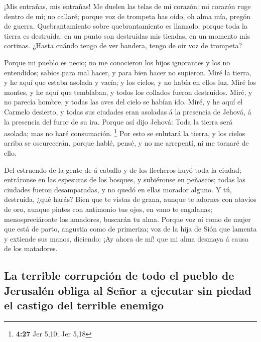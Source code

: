  ¡Mis entrañas, mis entrañas! Me duelen las telas de mi
corazón: mi corazón ruge dentro de mí; no callaré; porque voz de
trompeta has oído, oh alma mía, pregón de guerra. 
Quebrantamiento sobre quebrantamiento es llamado; porque toda la tierra
es destruída: en un punto son destruídas mis tiendas, en un momento mis
cortinas.  ¿Hasta cuándo tengo de ver bandera, tengo de oir
voz de trompeta?

 Porque mi pueblo es necio; no me conocieron los hijos
ignorantes y los no entendidos; sabios para mal hacer, y para bien hacer
no supieron.  Miré la tierra, y he aquí que estaba asolada
y vacía; y los cielos, y no había en ellos luz.  Miré los
montes, y he aquí que temblaban, y todos los collados fueron destruídos.
 Miré, y no parecía hombre, y todas las aves del cielo se
habían ido.  Miré, y he aquí el Carmelo desierto, y todas
sus ciudades eran asoladas á la presencia de Jehová, á la presencia del
furor de su ira.  Porque así dijo Jehová: Toda la tierra
será asolada; mas no haré consumación. \footnote{\textbf{4:27} Jer 5,10;
  Jer 5,18}  Por esto se enlutará la tierra, y los cielos
arriba se oscurecerán, porque hablé, pensé, y no me arrepentí, ni me
tornaré de ello.

 Del estruendo de la gente de á caballo y de los flecheros
huyó toda la ciudad; entráronse en las espesuras de los bosques, y
subiéronse en peñascos; todas las ciudades fueron desamparadas, y no
quedó en ellas morador alguno.  Y tú, destruída, ¿qué
harás? Bien que te vistas de grana, aunque te adornes con atavíos de
oro, aunque pintes con antimonio tus ojos, en vano te engalanas;
menospreciáronte los amadores, buscarán tu alma.  Porque
voz oí como de mujer que está de parto, angustia como de primeriza; voz
de la hija de Sión que lamenta y extiende sus manos, diciendo: ¡Ay ahora
de mí! que mi alma desmaya á causa de los matadores.

\hypertarget{la-terrible-corrupciuxf3n-de-todo-el-pueblo-de-jerusaluxe9n-obliga-al-seuxf1or-a-ejecutar-sin-piedad-el-castigo-del-terrible-enemigo}{%
\subsection{La terrible corrupción de todo el pueblo de Jerusalén obliga
al Señor a ejecutar sin piedad el castigo del terrible
enemigo}\label{la-terrible-corrupciuxf3n-de-todo-el-pueblo-de-jerusaluxe9n-obliga-al-seuxf1or-a-ejecutar-sin-piedad-el-castigo-del-terrible-enemigo}}

